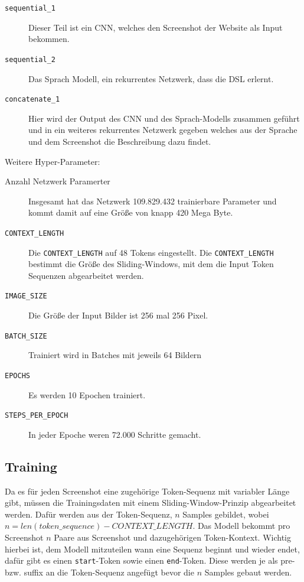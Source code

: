 \documentclass[pdftex,a4paper,halfparskip, article]{scrartcl}
\begin{document}
\begin{description}
	\item[\texttt{sequential\_1}] Dieser Teil ist ein CNN, welches den Screenshot der Website als Input bekommen.
	\item[\texttt{sequential\_2}] Das Sprach Modell, ein rekurrentes Netzwerk, dass die DSL erlernt.
	\item[\texttt{concatenate\_1}] Hier wird der Output des CNN und des Sprach-Modells zusammen geführt und in ein weiteres rekurrentes Netzwerk gegeben welches aus der Sprache und dem Screenshot die Beschreibung dazu findet.
\end{description}

Weitere Hyper-Parameter:
\begin{description}
	\item[Anzahl Netzwerk Paramerter] Insgesamt hat das Netzwerk 109.829.432 trainierbare Parameter und kommt damit auf eine Größe von knapp 420 Mega Byte.
	\item[\texttt{CONTEXT\_LENGTH}] Die \texttt{CONTEXT\_LENGTH} auf 48 Tokens eingestellt. Die \texttt{CONTEXT\_LENGTH} bestimmt die Größe des Sliding-Windows, mit dem die Input Token Sequenzen abgearbeitet werden. 
	\item[\texttt{IMAGE\_SIZE}] Die Größe der Input Bilder ist 256 mal 256 Pixel.
	\item[\texttt{BATCH\_SIZE}] Trainiert wird in Batches mit jeweils 64 Bildern
	\item[\texttt{EPOCHS}] Es werden 10 Epochen trainiert.
	\item[\texttt{STEPS\_PER\_EPOCH}] In jeder Epoche weren 72.000 Schritte gemacht.
	
\end{description}

\subsection*{Training}

Da es für jeden Screenshot eine zugehörige Token-Sequenz mit variabler Länge gibt, müssen die Trainingsdaten mit einem Sliding-Window-Prinzip abgearbeitet werden. Dafür werden aus der Token-Sequenz, $n$ Samples gebildet, wobei $n = len(token\_sequence) - CONTEXT\_LENGTH$. Das Modell bekommt pro Screenshot $n$ Paare aus Screenshot und dazugehörigen Token-Kontext. Wichtig hierbei ist, dem Modell mitzuteilen wann eine Sequenz beginnt und wieder endet, dafür gibt es einen \texttt{start}-Token sowie einen \texttt{end}-Token. Diese werden je als pre- bzw. suffix an die Token-Sequenz angefügt bevor die $n$ Samples gebaut werden. 
\end{document}
